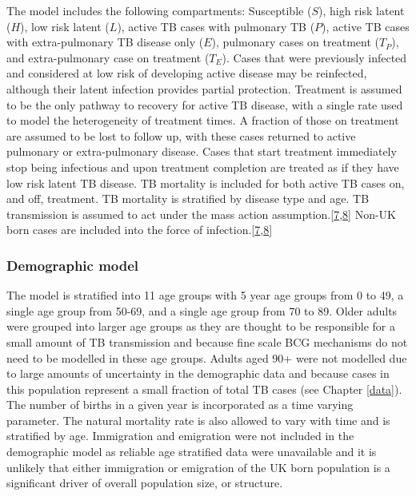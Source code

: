 \documentclass[11pt,twoside]{bristolthesis}
\begin{document}
  The model includes the following compartments: Susceptible (\(S\)), high risk latent (\(H\)), low risk latent (\(L\)), active TB cases with pulmonary TB (\(P\)), active TB cases with extra-pulmonary TB disease only (\(E\)), pulmonary cases on treatment (\(T_P\)), and extra-pulmonary case on treatment (\(T_E\)). Cases that were previously infected and considered at low risk of developing active disease may be reinfected, although their latent infection provides partial protection. Treatment is assumed to be the only pathway to recovery for active TB disease, with a single rate used to model the heterogeneity of treatment times. A fraction of those on treatment are assumed to be lost to follow up, with these cases returned to active pulmonary or extra-pulmonary disease. Cases that start treatment immediately stop being infectious and upon treatment completion are treated as if they have low risk latent TB disease. TB mortality is included for both active TB cases on, and off, treatment. TB mortality is stratified by disease type and age. TB transmission is assumed to act under the mass action assumption.{[}\protect\hyperlink{ref-Anderson1991}{7},\protect\hyperlink{ref-Keeling2007}{8}{]} Non-UK born cases are included into the force of infection.{[}\protect\hyperlink{ref-Anderson1991}{7},\protect\hyperlink{ref-Keeling2007}{8}{]}
  
  \hypertarget{demographic-model}{%
  \subsubsection{Demographic model}\label{demographic-model}}
  
  The model is stratified into 11 age groups with 5 year age groups from 0 to 49, a single age group from 50-69, and a single age group from 70 to 89. Older adults were grouped into larger age groups as they are thought to be responsible for a small amount of TB transmission and because fine scale BCG mechanisms do not need to be modelled in these age groups. Adults aged 90+ were not modelled due to large amounts of uncertainty in the demographic data and because cases in this population represent a small fraction of total TB cases (see Chapter \ref{data}). The number of births in a given year is incorporated as a time varying parameter. The natural mortality rate is also allowed to vary with time and is stratified by age. Immigration and emigration were not included in the demographic model as reliable age stratified data were unavailable and it is unlikely that either immigration or emigration of the UK born population is a significant driver of overall population size, or structure.
  
\end{document}
